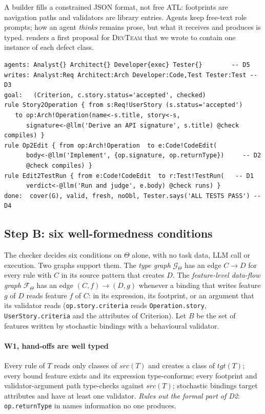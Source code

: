 \documentclass[10pt,conference]{IEEEtran}
\theoremstyle{definition}
\newcommand{\devteam}{\textsc{DevTeam}}
\newcommand{\Team}{\Theta}
\newcommand{\cls}[1]{\textsf{#1}}
\newcommand{\W}[1]{\textsf{W#1}}
\newcommand{\D}[1]{\textsf{D#1}}
\newcommand{\code}[1]{\texttt{#1}}
\begin{document}
A builder fills a constrained JSON format, not free ATL: footprints are
navigation paths and validators are library entries. Agents keep free-text
role prompts; how an agent \emph{thinks} remains prose, but what it receives
and produces is typed.  renders a first proposal for
\devteam{} that we wrote to contain one instance of each defect class.

\begin{lstlisting}[caption={Seeded proposal for \devteam{} (rendering of its JSON; defects marked).}, label={lst:proposal}]
agents: Analyst{} Architect{} Developer{exec} Tester{}        -- D5
writes: Analyst:Req Architect:Arch Developer:Code,Test Tester:Test -- D3
goal:   (Criterion, c.story.status='accepted', checked)
rule Story2Operation { from s:Req!UserStory (s.status='accepted')
   to op:Arch!Operation(name<-s.title, story<-s,
      signature<-@llm('Derive an API signature', s.title) @check compiles) }
rule Op2Edit { from op:Arch!Operation  to e:Code!CodeEdit(
      body<-@llm('Implement', {op.signature, op.returnType})     -- D2
      @check compiles) }
rule Edit2TestRun { from e:Code!CodeEdit  to r:Test!TestRun(   -- D1
      verdict<-@llm('Run and judge', e.body) @check runs) }
done:  cover(G), valid, fresh, noObl, Tester.says('ALL TESTS PASS') -- D4
\end{lstlisting}

\subsection{Step B: six well-formedness conditions}\label{sec:check}

The checker decides six conditions on $\Team$ alone, with no task data, LLM
call or execution. Two graphs support them. The \emph{type graph}
$\mathcal{G}_\Team$ has an edge $C\to D$ for every rule with $C$ in its source
pattern that creates $D$. The \emph{feature-level data-flow graph}
$\mathcal{F}_\Team$ has an edge $(C,f)\to(D,g)$ whenever a binding that writes
feature $g$ of $D$ reads feature $f$ of $C$: in its expression, its footprint,
or an argument that its validator reads (\code{op.story.criteria} reads
\code{Operation.story}, \code{UserStory.criteria} and the attributes of
\cls{Criterion}). Let $B$ be the set of features written by stochastic bindings
with a behavioural validator.

\paragraph*{\W1, hand-offs are well typed} Every rule of $T$ reads only
classes of $\mathit{src}(T)$ and creates a class of $\mathit{tgt}(T)$; every
bound feature exists and its expression type-conforms; every footprint and
validator-argument path type-checks against $\mathit{src}(T)$; stochastic
bindings target attributes and have at least one validator. \emph{Rules out
the formal part of \D2}: \code{op.returnType} in  names
information no one produces.
\end{document}
